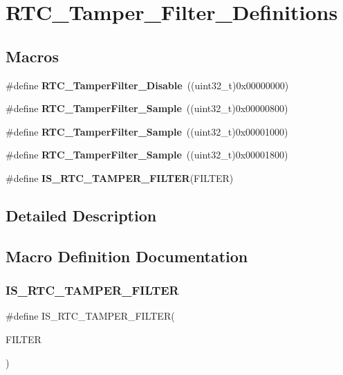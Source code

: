 \section{R\+T\+C\+\_\+\+Tamper\+\_\+\+Filter\+\_\+\+Definitions}
\label{group__RTC__Tamper__Filter__Definitions}
\subsection*{Macros}
\begin{DoxyCompactItemize}
\item 
\#define \textbf{ R\+T\+C\+\_\+\+Tamper\+Filter\+\_\+\+Disable}~((uint32\+\_\+t)0x00000000)
\item 
\#define \textbf{ R\+T\+C\+\_\+\+Tamper\+Filter\+\_\+Sample}~((uint32\+\_\+t)0x00000800)
\item 
\#define \textbf{ R\+T\+C\+\_\+\+Tamper\+Filter\+\_\+Sample}~((uint32\+\_\+t)0x00001000)
\item 
\#define \textbf{ R\+T\+C\+\_\+\+Tamper\+Filter\+\_\+Sample}~((uint32\+\_\+t)0x00001800)
\item 
\#define \textbf{ I\+S\+\_\+\+R\+T\+C\+\_\+\+T\+A\+M\+P\+E\+R\+\_\+\+F\+I\+L\+T\+ER}(F\+I\+L\+T\+ER)
\end{DoxyCompactItemize}


\subsection{Detailed Description}


\subsection{Macro Definition Documentation}
\mbox{\label{group__RTC__Tamper__Filter__Definitions_gaa695f102d84ff00aef2b7539f1293b00}} 
\subsubsection{I\+S\+\_\+\+R\+T\+C\+\_\+\+T\+A\+M\+P\+E\+R\+\_\+\+F\+I\+L\+T\+ER}
{\footnotesize\ttfamily \#define I\+S\+\_\+\+R\+T\+C\+\_\+\+T\+A\+M\+P\+E\+R\+\_\+\+F\+I\+L\+T\+ER(\begin{DoxyParamCaption}\item[{}]{F\+I\+L\+T\+ER }\end{DoxyParamCaption})}

